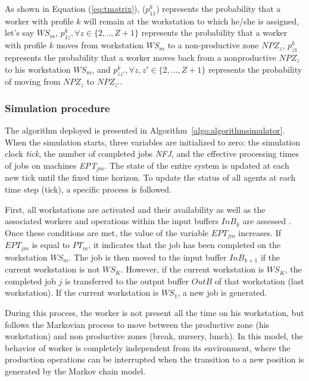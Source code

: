 \documentclass[review,12pt, 3p, times]{elsarticle}
\begin{document}
As shown in Equation (\ref{eq:tmatrix}), ($p_{11}^k$) represents the probability that a worker with profile $k$ will remain at the workstation to which he/she is assigned, let's say $\textit{WS}_m$, $p_{1z}^k, \forall z\in \{2,..,Z+1\}$ represents the probability that a worker with profile $k$ moves from  workstation $\textit{WS}_m$ to a non-productive zone $\textit{NPZ}_z$, $p_{z1}^k$ represents the probability that a worker moves back from a nonproductive $\textit{NPZ}_z$ to his workstation $\textit{WS}_m$, and $p_{zz'}^k, \forall z,z'\in \{2,...,Z+1\} $ represents the probability of moving from $\textit{NPZ}_{z}$ to $\textit{NPZ}_{z'}$.

  


	
	
\subsubsection{Simulation procedure}
The algorithm deployed is presented in Algorithm~\ref{algo:algorithmsimulator}. When the simulation starts, three variables are initialized to zero: the simulation clock \textit{tick}, the number of completed jobs \textit{NFJ}, and the effective processing times of jobs on machines \textit{EPT}$_{jm}$. The state of the entire system is updated at each new tick until the fixed time horizon. To update the status of all agents at each time step (tick), a specific process is followed.
	    
First, all workstations are activated and their availability as well as the associated workers and operations within the input buffers $InB_{k}$ are assessed . Once these conditions are met, the value of the variable $EPT_{jm}$ increases. If $EPT_{jm}$ is equal to $PT_{m}$, it indicates that the job has been completed on the workstation $\textit{WS}_m$. The job is then moved to the input buffer $InB_{k+1}$ if the current workstation is not $\textit{WS}_K$. However, if the current workstation is $\textit{WS}_K$, the completed job $j$ is transferred to the output buffer $OutB$ of that workstation (last workstation). If the current workstation is $\textit{WS}_1$, a new job is generated. 

During this process, the worker is not present all the time on his workstation, but follows the Markovian process to move between the productive zone (his workstation) and non productive zones (break, nursery, lunch). In this model, the behavior of worker is completely independent from its environment, where the production operations can be interrupted when the transition to a new position is generated by the Markov chain model.   
\end{document}
